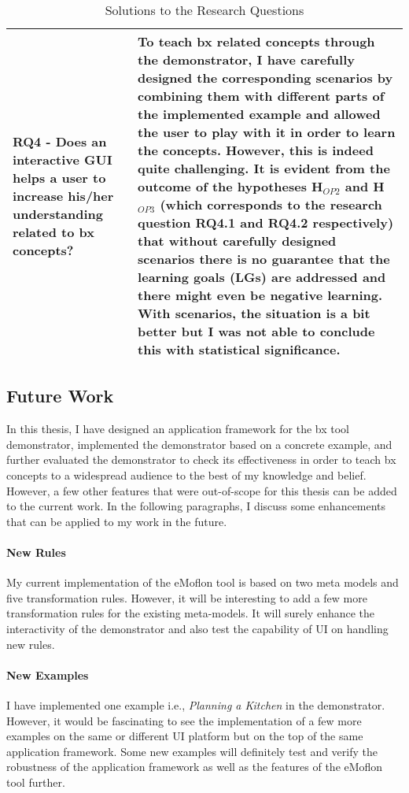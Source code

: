 \begin{table}
	\begin{tabular}{|p{5cm}|p{9.5cm}|}
		\hline	
		\textbf{RQ4 -} Does an interactive GUI helps a user to increase his/her understanding related to bx concepts? &
		To teach bx related concepts through the demonstrator, I have carefully designed the corresponding scenarios by combining them with different parts of the implemented example and allowed the user to play with it in order to learn the concepts. However, this is indeed quite challenging. It is evident from the outcome of the hypotheses H$_{OP2}$ and H$_{OP3}$ (which corresponds to the research question \textbf{RQ4.1} and \textbf{RQ4.2} respectively) that without carefully designed scenarios there is no guarantee that the learning goals (\textbf{LG}s) are addressed and there might even be negative learning. With scenarios, the situation is a bit better but I was not able to conclude this with statistical significance.\\
		\hline			
	\end{tabular}
	\caption{Solutions to the Research Questions}
	\label{tab:Solutions_ResearchQuestions}
\end{table}

\subsection{Future Work}\label{subsec:futurework}
In this thesis, I have designed an application framework for the bx tool demonstrator, implemented the demonstrator based on a concrete example, and further evaluated the demonstrator to check its effectiveness in order to teach bx concepts to a widespread audience to the best of my knowledge and belief. However, a few other features that were out-of-scope for this thesis can be added to the current work. In the following paragraphs, I discuss some enhancements that can be applied to my work in the future.
 
\paragraph{New Rules}
My current implementation of the eMoflon tool is based on two meta models and five transformation rules. However, it will be interesting to add a few more transformation rules for the existing meta-models. It will surely enhance the interactivity of the demonstrator and also test the capability of UI on handling new rules.

\paragraph{New Examples} I have implemented one example i.e., \textit{Planning a Kitchen} in the demonstrator. However, it would be fascinating to see the implementation of a few more examples on the same or different UI platform but on the top of the same application framework. Some new examples will definitely test and verify the robustness of the application framework as well as the features of the eMoflon tool further.

